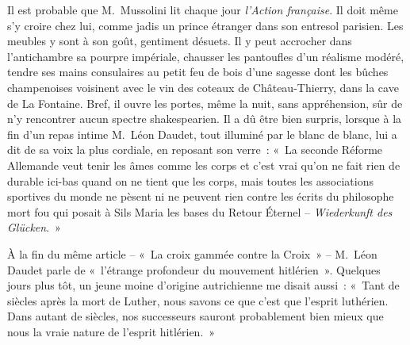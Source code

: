 \documentclass[french,twoside]{book} %
\begin{document}
Il est probable que M. Mussolini lit chaque jour \emph{l’Action française}. Il doit même s’y croire chez lui, comme jadis un prince étranger dans son entresol parisien. Les meubles y sont à son goût, gentiment désuets. Il y peut accrocher dans l’antichambre sa pourpre impériale, chausser les pantoufles d’un réalisme modéré, tendre ses mains consulaires au petit feu de bois d’une sagesse dont les bûches champenoises voisinent avec le vin des coteaux de Château-Thierry, dans la cave de La Fontaine. Bref, il ouvre les portes, même la nuit, sans appréhension, sûr de n’y rencontrer aucun spectre shakespearien. Il a dû être bien surpris, lorsque à la fin d’un repas intime M. Léon Daudet, tout illuminé par le blanc de blanc, lui a dit de sa voix la plus cordiale, en reposant son verre : « La seconde Réforme Allemande veut tenir les âmes comme les corps et c’est vrai qu’on ne fait rien de durable ici-bas quand on ne tient que les corps, mais toutes les associations sportives du monde ne pèsent ni ne peuvent rien contre les écrits du philosophe mort fou qui posait à Sils Maria les bases du Retour Éternel – \emph{Wiederkunft des Glücken}. »\par
À la fin du même article – « La croix gammée contre la Croix » – M. Léon Daudet parle de « l’étrange profondeur du mouvement hitlérien ». Quelques jours plus tôt, un jeune moine d’origine autrichienne me disait aussi : « Tant de siècles après la mort de Luther, nous savons ce que c’est que l’esprit luthérien. Dans autant de siècles, nos successeurs sauront probablement bien mieux que nous la vraie nature de l’esprit hitlérien. »\par
\end{document}
